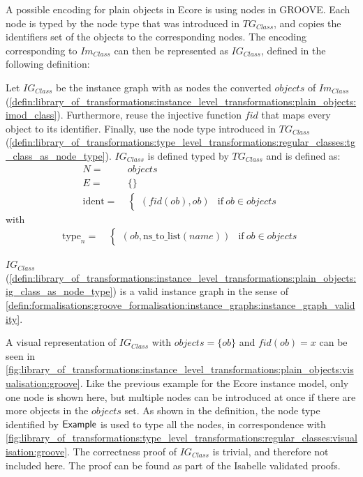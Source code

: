 A possible encoding for plain objects in Ecore is using nodes in GROOVE. Each node is typed by the node type that was introduced in $TG_{Class}$, and copies the identifiers set of the objects to the corresponding nodes. The encoding corresponding to $Im_{Class}$ can then be represented as $IG_{Class}$, defined in the following definition:

\begin{defin}
\label{defin:library_of_transformations:instance_level_transformations:plain_objects:ig_class_as_node_type}
Let $IG_{Class}$ be the instance graph with as nodes the converted $objects$ of $Im_{Class}$ (\cref{defin:library_of_transformations:instance_level_transformations:plain_objects:imod_class}). Furthermore, reuse the injective function $fid$ that maps every object to its identifier. Finally, use the node type introduced in $TG_{Class}$ (\cref{defin:library_of_transformations:type_level_transformations:regular_classes:tg_class_as_node_type}). $IG_{Class}$ is defined typed by $TG_{Class}$ and is defined as:
\begin{align*}
N =\ & objects \\
E =\ & \{\} \\
\mathrm{ident} =\ & \begin{cases}
    (fid(ob), ob) & \mathrm{if }\ ob \in objects
\end{cases}
\end{align*}
with
\begin{align*}
\mathrm{type}_n =\ & \begin{cases}
    (ob, \mathrm{ns\_\!to\_\!list}(name)) & \mathrm{if }\ ob \in objects
\end{cases}
\end{align*}
\end{defin}

\begin{thm}
\label{defin:library_of_transformations:instance_level_transformations:plain_objects:ig_class_as_node_type_correct}
$IG_{Class}$ (\cref{defin:library_of_transformations:instance_level_transformations:plain_objects:ig_class_as_node_type}) is a valid instance graph in the sense of \cref{defin:formalisations:groove_formalisation:instance_graphs:instance_graph_validity}.
\end{thm}

A visual representation of $IG_{Class}$ with $objects = \{ob\}$ and $fid(ob) = x$ can be seen in \cref{fig:library_of_transformations:instance_level_transformations:plain_objects:visualisation:groove}. Like the previous example for the Ecore instance model, only one node is shown here, but multiple nodes can be introduced at once if there are more objects in the $objects$ set. As shown in the definition, the node type identified by $\mathsf{Example}$ is used to type all the nodes, in correspondence with \cref{fig:library_of_transformations:type_level_transformations:regular_classes:visualisation:groove}. The correctness proof of $IG_{Class}$ is trivial, and therefore not included here. The proof can be found as part of the Isabelle validated proofs.

